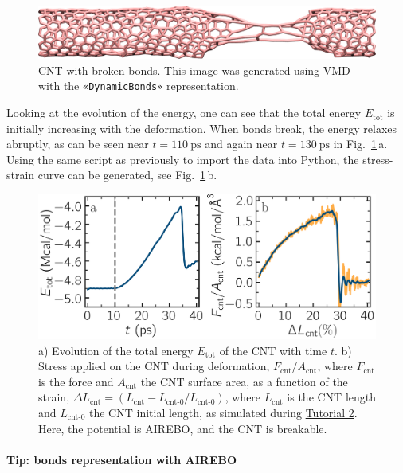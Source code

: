 \documentclass[9pt,tutorial]{livecoms}
\newcommand{\guicmd}[1]{\textcolor{command}{\texttt{«#1»}}} %
\begin{document}
\begin{figure}
\centering
\includegraphics[width=\linewidth]{CNT-deformed-breakable}
\caption{CNT with broken bonds.  This image was generated using
VMD~\cite{vmd_home,humphrey1996vmd} with the \guicmd{DynamicBonds} representation.}
\label{fig:CNT-deformed-breakable}
\end{figure}

Looking at the evolution of the energy, one can see that the total
energy $E_\text{tot}$ is initially increasing with the deformation.  When
bonds break, the energy relaxes abruptly,
as can be seen near $t=110~\text{ps}$ and again near $t=130~\text{ps}$ in
Fig.~\ref{fig:CNT-deformed-breakable}\,a.  Using the same script as previously to
import the data into Python, the stress-strain
curve can be generated, see Fig.~\ref{fig:CNT-deformed-breakable}\,b.

\begin{figure}
\centering
\includegraphics[width=\linewidth]{CNT-breakable-stress-energy}
\caption{a) Evolution of the total energy $E_\text{tot}$ of the CNT with time $t$.
b) Stress applied on the CNT during deformation, $F_\text{cnt}/A_\text{cnt}$,
where $F_\text{cnt}$ is the force and $A_\text{cnt}$ the CNT surface area,
as a function of the strain, $\Delta L_\text{cnt} = (L_\text{cnt}-L_\text{cnt-0}/L_\text{cnt-0})$, where
$L_\text{cnt}$ is the CNT length and $L_\text{cnt-0}$ the CNT initial length,
as simulated during \hyperref[carbon-nanotube-label]{Tutorial 2}.
Here, the potential is AIREBO, and the CNT is breakable.}
\label{fig:CNT-breakable-energy-stress}
\end{figure}

\paragraph{Tip: bonds representation with AIREBO}
\end{document}
